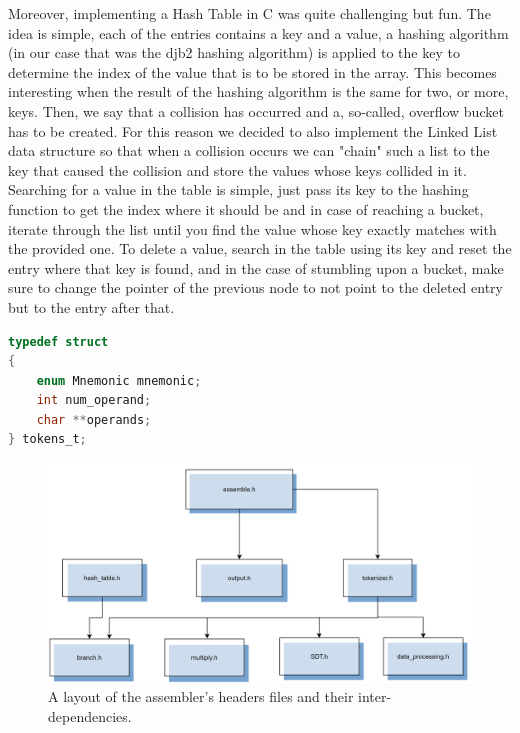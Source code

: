 \documentclass{article}
\begin{document}
Moreover, implementing a Hash Table in C was quite challenging but fun. The idea is simple, each of the entries contains a key and a value, a hashing algorithm (in our case that was the djb2 hashing algorithm) is applied to the key to determine the index of the value that is to be stored in the array. This becomes interesting when the result of the hashing algorithm is the same for two, or more, keys. Then, we say that a collision has occurred and a, so-called, overflow bucket has to be created. For this reason we decided to also implement the Linked List data structure so that when a collision occurs we can "chain" such a list to the key that caused the collision and store the values whose keys collided in it. Searching for a value in the table is simple, just pass its key to the hashing function to get the index where it should be and in case of reaching a bucket, iterate through the list until you find the value whose key exactly matches with the provided one. To delete a value, search in the table using its key and reset the entry where that key is found, and in the case of stumbling upon a bucket, make sure to change the pointer of the previous node to not point to the deleted entry but to the entry after that. \\ \par \noindent

\begin{blackbox}
\begin{lstlisting}[basicstyle=\large,language=C]
typedef struct
{
    enum Mnemonic mnemonic;
    int num_operand;
    char **operands;
} tokens_t;
\end{lstlisting}
\end{blackbox}

\begin{figure}[!ht]
\centering
\includegraphics[scale=0.7]{AssemblerStructureStylized.png}
\caption{A layout of the assembler's headers files and their inter-dependencies.} 
\end{figure}
\end{document}
